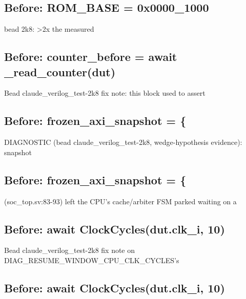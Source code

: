 \begin{record}

\subsection*{Before: ROM\_BASE = 0x0000\_1000}

\begin{textblock}
bead 2k8: >2x the measured
\end{textblock}

\subsection*{Before: counter\_before = await \_read\_counter(dut)}

\begin{textblock}
Bead claude_verilog_test-2k8 fix note: this block used to assert
\end{textblock}

\subsection*{Before: frozen\_axi\_snapshot = \{}

\begin{textblock}
DIAGNOSTIC (bead claude_verilog_test-2k8, wedge-hypothesis evidence): snapshot
\end{textblock}

\subsection*{Before: frozen\_axi\_snapshot = \{}

\begin{textblock}
(soc_top.sv:83-93) left the CPU's cache/arbiter FSM parked waiting on a
\end{textblock}

\subsection*{Before: await ClockCycles(dut.clk\_i, 10)}

\begin{textblock}
Bead claude_verilog_test-2k8 fix note on DIAG_RESUME_WINDOW_CPU_CLK_CYCLES's
\end{textblock}

\subsection*{Before: await ClockCycles(dut.clk\_i, 10)}


\end{record}
